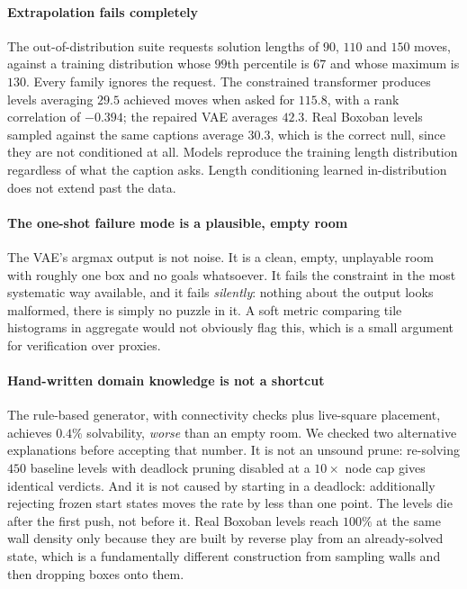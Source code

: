 \documentclass[conference]{IEEEtran}
\begin{document}
\paragraph{Extrapolation fails completely}
The out-of-distribution suite requests solution lengths of $90$, $110$ and $150$
moves, against a training distribution whose $99$th percentile is $67$ and whose
maximum is $130$. Every family ignores the request. The constrained transformer
produces levels averaging $29.5$ achieved moves when asked for $115.8$, with a
rank correlation of $-0.394$; the repaired VAE averages $42.3$. Real Boxoban
levels sampled against the same captions average $30.3$, which is the correct
null, since they are not conditioned at all. Models reproduce the training length
distribution regardless of what the caption asks. Length conditioning learned
in-distribution does not extend past the data.

\paragraph{The one-shot failure mode is a plausible, empty room}
The VAE's argmax output is not noise. It is a clean, empty, unplayable room with
roughly one box and no goals whatsoever. It fails the constraint in the most
systematic way available, and it fails \emph{silently}: nothing about the output
looks malformed, there is simply no puzzle in it. A soft metric comparing tile
histograms in aggregate would not obviously flag this, which is a small argument
for verification over proxies.

\paragraph{Hand-written domain knowledge is not a shortcut}
The rule-based generator, with connectivity checks plus live-square placement,
achieves $0.4\%$ solvability, \emph{worse} than an empty room. We checked two
alternative explanations before accepting that number. It is not an unsound
prune: re-solving $450$ baseline levels with deadlock pruning disabled at a
$10\times$ node cap gives identical verdicts. And it is not caused by starting
in a deadlock: additionally rejecting frozen start states moves the rate by less
than one point. The levels die after the first push, not before it. Real Boxoban
levels reach $100\%$ at the same wall density only because they are built by
reverse play from an already-solved state, which is a fundamentally different
construction from sampling walls and then dropping boxes onto them.
\end{document}
